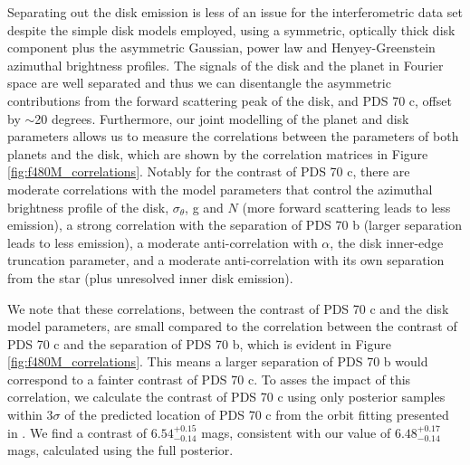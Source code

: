 \documentclass[11pt,twocolumn,twocolappendix]{aastex631}
\begin{document}
{Separating out the disk emission is less of an issue for the %
{interferometric} data set despite the simple disk {models employed, using a symmetric, optically thick disk component plus the {asymmetric} Gaussian, power law and Henyey-Greenstein azimuthal brightness profiles.} 
The signals of the disk and the planet in Fourier space are well separated and thus we can disentangle the asymmetric contributions from the forward scattering peak of the disk, and PDS 70 c, offset by $\sim$20 degrees.%
Furthermore, our joint modelling of the planet and disk parameters allows us to measure the correlations between the parameters of both planets and the disk, which are shown by the {correlation matrices in Figure \ref{fig:f480M_correlations}}. {Notably for the contrast of PDS 70 c, there are moderate correlations with the model parameters that control the azimuthal brightness profile of the disk, $\sigma_{\theta}$, g and $N$ (more forward scattering leads to less emission), a strong correlation with the separation of PDS 70 b (larger separation leads to less emission), a moderate anti-correlation with $\alpha$, the disk inner-edge truncation parameter, and a moderate anti-correlation with its own separation from the star (plus unresolved inner disk emission). }}

{We note that these correlations, between the contrast of PDS 70 c and the disk model parameters, are small compared to the correlation between the contrast of PDS 70 c and the separation of PDS 70 b, which is evident in {Figure \ref{fig:f480M_correlations}}. This means a larger separation of PDS 70 b would correspond to a fainter contrast of PDS 70 c. To asses the impact of this correlation, we calculate the contrast of PDS 70 c using only posterior samples within 3$\sigma$ of the predicted location of PDS 70 c from the orbit fitting presented in \cite{2021AJ....161..148W}. We find a contrast of $6.54^{+0.15}_{-0.14}$ mags, consistent with our value of $6.48^{+0.17}_{-0.14}$ mags, calculated using the full posterior.} %
\end{document}
